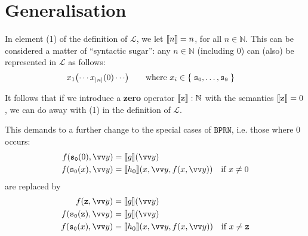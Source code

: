 

\section{Generalisation}


In element (1) of the definition of $\mathcal{L}$, we let ${\mathopen{}\left\llbracket{n}\right\rrbracket\mathclose{}} = n$, for
all $n \in \mathbb{N}$. This can be considered a matter of ``syntactic sugar'':
any $n \in \mathbb{N}$ (including $0$) can (also) be represented in
$\mathcal{L}$ as follows:\begin{align*}
%
x_1\p{\cdots x_{\card{n}}\p{0} \cdots} & \quad \quad \text{where $x_i \in
\set{\mathtt{s_0}, \ldots, \mathtt{s_9}}$}
%
\end{align*}


It follows that if we introduce a \textbf{zero} operator ${\mathopen{}\left\llbracket{\mathtt{z}}\right\rrbracket\mathclose{}} :
\mathbb{N}$ with the semantics ${\mathopen{}\left\llbracket{\mathtt{z}}\right\rrbracket\mathclose{}} = 0$, we can do away with (1)
in the definition of $\mathcal{L}$.

This demands to a further change to the special cases of $\mathtt{BPRN}$, i.e.
those where $0$ occurs:\begin{align*}
%
f\p{\mathtt{s_0}\p{0}, \vect{y}} &= \sem{g}\p{\vect{y}} \\
%
f\p{\mathtt{s_0}\p{x}, \vect{y}} &= \sem{h_0}\p{x, \vect{y}, f\p{x, \vect{y}}}
& \text{if $x\neq 0$}
%
\end{align*} are replaced by \begin{align*}
%
f\p{\mathtt{z}, \vect{y}} &= \sem{g}\p{\vect{y}} \\
%
f\p{\mathtt{s_0}\p{\mathtt{z}}, \vect{y}} &= \sem{g}\p{\vect{y}} \\
%
f\p{\mathtt{s_0}\p{x}, \vect{y}} &= \sem{h_0}\p{x, \vect{y}, f\p{x, \vect{y}}}
& \text{if $x\neq \mathtt{z}$}
%
\end{align*}

